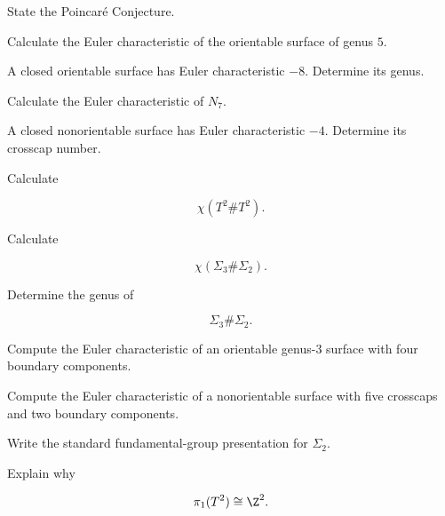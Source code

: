 \begin{exercise}[1]
State the Poincar\'e Conjecture.
\end{exercise}

\begin{exercise}[2]
Calculate the Euler characteristic of the orientable surface of genus \(5\).
\end{exercise}

\begin{exercise}[2]
A closed orientable surface has Euler characteristic \(-8\).
Determine its genus.
\end{exercise}

\begin{exercise}[2]
Calculate the Euler characteristic of \(N_7\).
\end{exercise}

\begin{exercise}[2]
A closed nonorientable surface has Euler characteristic \(-4\).
Determine its crosscap number.
\end{exercise}

\begin{exercise}[2]
Calculate

\[
\chi(T^2\#T^2).
\]
\end{exercise}

\begin{exercise}[2]
Calculate

\[
\chi(\Sigma_3\#\Sigma_2).
\]
\end{exercise}

\begin{exercise}[2]
Determine the genus of

\[
\Sigma_3\#\Sigma_2.
\]
\end{exercise}

\begin{exercise}[2]
Compute the Euler characteristic of an orientable genus-\(3\) surface with
four boundary components.
\end{exercise}

\begin{exercise}[2]
Compute the Euler characteristic of a nonorientable surface with five
crosscaps and two boundary components.
\end{exercise}

\begin{exercise}[2]
Write the standard fundamental-group presentation for \(\Sigma_2\).
\end{exercise}

\begin{exercise}[2]
Explain why

\[
\pi_1(T^2)\cong\Z^2.
\]
\end{exercise}

